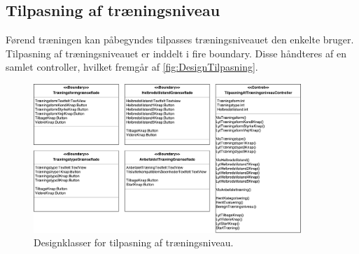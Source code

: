 \subsection*{Tilpasning af træningsniveau}
Førend træningen kan påbegyndes tilpasses træningsniveauet den enkelte bruger. Tilpasning af træningsniveauet er inddelt i fire boundary. Disse håndteres af en samlet controller, hvilket fremgår af \autoref{fig:DesignTilpasning}.

\begin{figure} [H]
\centering
\includegraphics[width=0.9\textwidth]{figures/MVC/MVCTilpasning}
\caption{Designklasser for tilpasning af træningsniveau.}
\label{fig:DesignTilpasning}
\end{figure}

